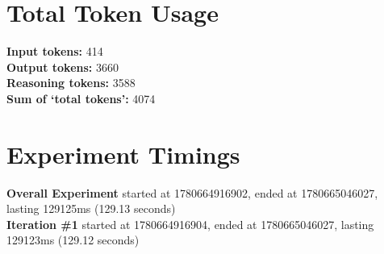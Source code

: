 \documentclass{article}
\begin{document}
\section*{Total Token Usage}
\textbf{Input tokens: }414
\\\textbf{Output tokens: }3660
\\\textbf{Reasoning tokens: }3588
\\\textbf{Sum of `total tokens': }4074
\section*{Experiment Timings}
\textbf{Overall Experiment} started at 1780664916902, ended at 1780665046027, lasting 129125ms (129.13 seconds)
\\\textbf{Iteration \#1} started at 1780664916904, ended at 1780665046027, lasting 129123ms (129.12 seconds)
\end{document}

